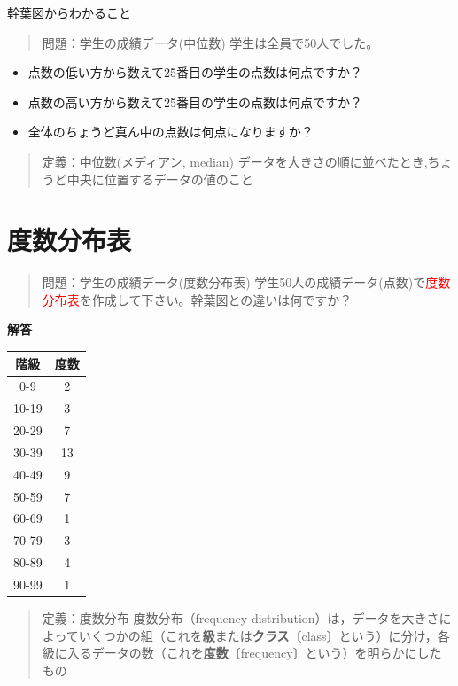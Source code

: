 \documentclass[
]{book}
\providecommand{\tightlist}{%
  \setlength{\itemsep}{0pt}\setlength{\parskip}{0pt}}
\theoremstyle{definition}
\theoremstyle{definition}
\theoremstyle{definition}
\theoremstyle{definition}
\theoremstyle{remark}
\begin{document}
幹葉図からわかること

\begin{quote}
問題：学生の成績データ(中位数)
学生は全員で50人でした。
\end{quote}

\begin{itemize}
\tightlist
\item
  点数の低い方から数えて25番目の学生の点数は何点ですか？
\item
  点数の高い方から数えて25番目の学生の点数は何点ですか？
\item
  全体のちょうど真ん中の点数は何点になりますか？
\end{itemize}

\begin{quote}
定義：中位数(メディアン, median)
データを大きさの順に並べたとき,ちょうど中央に位置するデータの値のこと
\end{quote}

\hypertarget{ux5ea6ux6570ux5206ux5e03ux8868}{%
\section{度数分布表}\label{ux5ea6ux6570ux5206ux5e03ux8868}}

\begin{quote}
問題：学生の成績データ(度数分布表)
学生50人の成績データ(点数)で\textcolor{red}{度数分布表}を作成して下さい。幹葉図との違いは何ですか？
\end{quote}

\textbf{解答}

\begin{longtable}[]{@{}cc@{}}
\toprule()
階級 & 度数 \\
\midrule()
\endhead
0-9 & 2 \\
10-19 & 3 \\
20-29 & 7 \\
30-39 & 13 \\
40-49 & 9 \\
50-59 & 7 \\
60-69 & 1 \\
70-79 & 3 \\
80-89 & 4 \\
90-99 & 1 \\
\bottomrule()
\end{longtable}

\begin{quote}
定義：度数分布
度数分布（frequency distribution）は，データを大きさによっていくつかの組（これを\textbf{級}または\textbf{クラス}〔class〕という）に分け，各級に入るデータの数（これを\textbf{度数}〔frequency〕という）を明らかにしたもの
\end{quote}
\end{document}
